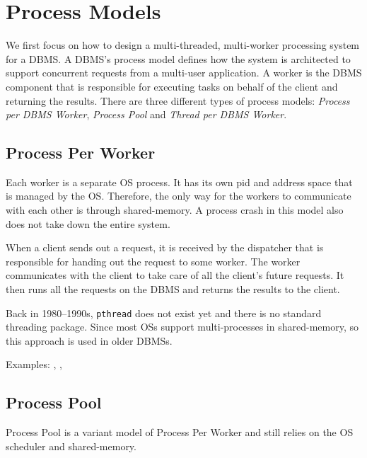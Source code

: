 \documentclass[11pt]{article}
\begin{document}
\section{Process Models}
We first focus on how to design a multi-threaded, multi-worker processing system for a DBMS. A 
DBMS's process model defines how the system is architected to support concurrent requests from a 
multi-user application. A worker is the DBMS component that is responsible for executing tasks on 
behalf of the client and returning the results. There are three different types of process models: 
\textit{Process per DBMS Worker}, \textit{Process Pool} and \textit{Thread per DBMS Worker}.

\subsection*{Process Per Worker}
Each worker is a separate OS process. It has its own pid and address space that is managed by the 
OS. Therefore, the only way for the workers to communicate with each other is through shared-memory. 
A process crash in this model also does not take down the entire system.

When a client sends out a request, it is received by the dispatcher that is responsible for handing 
out the request to some worker. The worker communicates with the client to take care of all the 
client's future requests. It then runs all the requests on the DBMS and returns the results to the 
client.

Back in 1980--1990s, \texttt{pthread} does not exist yet and there is no standard threading 
package. Since most OSs support multi-processes in shared-memory, so this approach is used in older 
DBMSs. 

Examples: , , 

\subsection*{Process Pool}
Process Pool is a variant model of Process Per Worker and still relies on the OS scheduler and 
shared-memory. 
\end{document}
